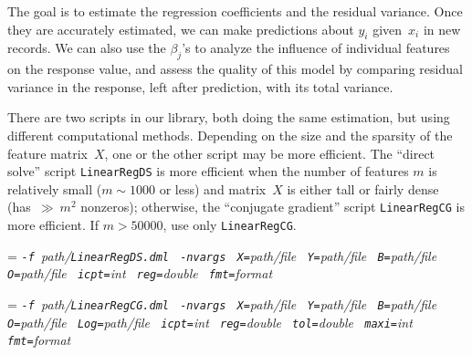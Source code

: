 The goal is to estimate the regression coefficients and the residual variance.
Once they are accurately estimated, we can make predictions about $y_i$ given~$x_i$
in new records.  We can also use the $\beta_j$'s to analyze the influence of individual
features on the response value, and assess the quality of this model by comparing
residual variance in the response, left after prediction, with its total variance.

There are two scripts in our library, both doing the same estimation, but using different
computational methods.  Depending on the size and the sparsity of the feature matrix~$X$,
one or the other script may be more efficient.  The ``direct solve'' script
{\tt LinearRegDS} is more efficient when the number of features $m$ is relatively small
($m \sim 1000$ or less) and matrix~$X$ is either tall or fairly dense
(has~${\gg}\:m^2$ nonzeros); otherwise, the ``conjugate gradient'' script {\tt LinearRegCG}
is more efficient.  If $m > 50000$, use only {\tt LinearRegCG}.

\smallskip
{}
\smallskip

{\hangindent=\parindent\noindent\it%
{\tt{}-f }path/\/{\tt{}LinearRegDS.dml}
{\tt{} -nvargs}
{\tt{} X=}path/file
{\tt{} Y=}path/file
{\tt{} B=}path/file
{\tt{} O=}path/file
{\tt{} icpt=}int
{\tt{} reg=}double
{\tt{} fmt=}format

}\smallskip
{\hangindent=\parindent\noindent\it%
{\tt{}-f }path/\/{\tt{}LinearRegCG.dml}
{\tt{} -nvargs}
{\tt{} X=}path/file
{\tt{} Y=}path/file
{\tt{} B=}path/file
{\tt{} O=}path/file
{\tt{} Log=}path/file
{\tt{} icpt=}int
{\tt{} reg=}double
{\tt{} tol=}double
{\tt{} maxi=}int
{\tt{} fmt=}format

}

